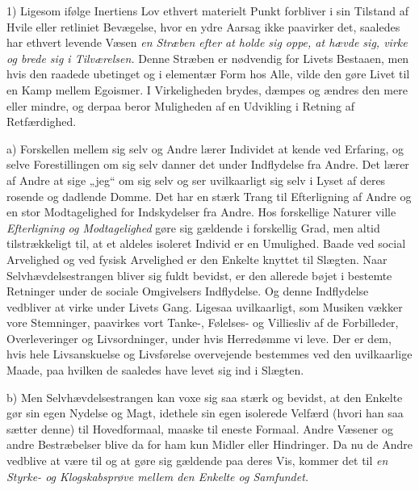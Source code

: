 \documentclass[12pt,a4paper,openany]{book}
\newcommand{\opage}[1]{\marginnote{\footnotesize\textit{[#1]}}}
\begin{document}
1) Ligesom ifølge Inertiens Lov ethvert materielt Punkt
forbliver i sin Tilstand af Hvile eller retliniet Bevægelse, hvor
en ydre Aarsag ikke paavirker det, saaledes har ethvert levende
Væsen \textit{en Stræben efter at holde sig oppe, at hævde sig, virke og
brede sig i Tilværelsen.} Denne Stræben er nødvendig for Livets
Bestaaen, men hvis den raadede ubetinget og i elementær Form
\setcounter{footnote}{0}%
\opage{57}hos Alle, vilde den gøre Livet til en Kamp mellem Egoismer.
I Virkeligheden brydes, dæmpes og ændres den mere eller
mindre, og derpaa beror Muligheden af en Udvikling i Retning
af Retfærdighed.

a) Forskellen mellem sig selv og Andre lærer Individet at
kende ved Erfaring, og selve Forestillingen om sig selv danner
det under Indflydelse fra Andre. Det lærer af Andre at sige
„jeg“ om sig selv og ser uvilkaarligt sig selv i Lyset af deres
rosende og dadlende Domme. Det har en stærk Trang til Efterligning
af Andre og en stor Modtagelighed for Indskydelser fra
Andre. Hos forskellige Naturer ville \textit{Efterligning og Modtagelighed}
gøre sig gældende i forskellig Grad, men altid tilstrækkeligt til,
at et aldeles isoleret Individ er en Umulighed. Baade ved social
Arvelighed og ved fysisk Arvelighed er den Enkelte knyttet til
Slægten. Naar Selvhævdelsestrangen bliver sig fuldt bevidst, er
den allerede bøjet i bestemte Retninger under de sociale Omgivelsers
Indflydelse. Og denne Indflydelse vedbliver at virke
under Livets Gang. Ligesaa uvilkaarligt, som Musiken vækker
vore Stemninger, paavirkes vort Tanke-, Følelses- og Villiesliv
af de Forbilleder, Overleveringer og Livsordninger, under hvis
Herredømme vi leve. Der er dem, hvis hele Livsanskuelse og
Livsførelse overvejende bestemmes ved den uvilkaarlige Maade,
paa hvilken de saaledes have levet sig ind i Slægten.

b) Men Selvhævdelsestrangen kan voxe sig saa stærk og
bevidst, at den Enkelte gør sin egen Nydelse og Magt, idethele
sin egen isolerede Velfærd (hvori han saa sætter denne)
til Hovedformaal, maaske til eneste Formaal. Andre Væsener og
andre Bestræbelser blive da for ham kun Midler eller Hindringer.
Da nu de Andre vedblive at være til og at gøre sig
gældende paa deres Vis, kommer det til \textit{en Styrke- og Klogskabsprøve
mellem den Enkelte og Samfundet.}
\end{document}
